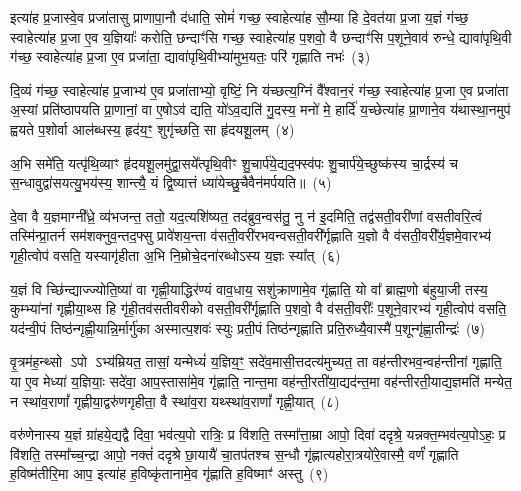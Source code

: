 इत्या॑ह प्र॒जास्वे॒व प्रजा॑तासु प्राणापा॒नौ द॑धाति॒ सोमं॑ गच्छ॒ स्वाहेत्या॑ह सौ॒म्या हि दे॒वत॑या प्र॒जा य॒ज्ञं ग॑च्छ॒ स्वाहेत्या॑ह प्र॒जा ए॒व य॒ज्ञियाः᳚ करोति॒ छन्दाꣳ॑सि गच्छ॒ स्वाहेत्या॑ह प॒शवो॒ वै छन्दाꣳ॑सि प॒शूने॒वाव॑ रुन्धे॒ द्यावा॑\-पृथि॒वी ग॑च्छ॒ स्वाहेत्या॑ह प्र॒जा ए॒व प्रजा॑ता॒ द्यावा॑\-पृथि॒वीभ्या॑मुभ॒यतः॒ परि॑ गृह्णाति नभः॑~(३)

दि॒व्यं ग॑च्छ॒ स्वाहेत्या॑ह प्र॒जाभ्य॑ ए॒व प्रजा॑ताभ्यो॒ वृष्टिं॒ नि य॑च्छत्य॒ग्निं वै᳚श्वान॒रं ग॑च्छ॒ स्वाहेत्या॑ह प्र॒जा ए॒व प्रजा॑ता अ॒स्यां प्रति॑\-ष्ठापयति प्रा॒णानां॒ वा ए॒षो\-ऽव॑ द्यति॒ यो॑\-ऽव॒द्यति॑ गु॒दस्य॒ मनो॑ मे॒ हार्दि॑ य॒च्छेत्या॑ह प्रा॒णाने॒व य॑थास्था॒नमुप॑ ह्वयते प॒शोर्वा आल॑ब्धस्य॒ हृद॑य॒ꣳ॒ शुगृ॑च्छति॒ सा हृ॑दयशू॒लम्~(४)

अ॒भि समे॑ति॒ यत्पृ॑थि॒व्याꣳ हृ॑दयशू॒लमु॑द्वा॒सये᳚त्पृथि॒वीꣳ शु॒चार्प॑ये॒द्यद॒फ्स्व॑पः शु॒चार्प॑ये॒च्छुष्क॑स्य चा॒र्द्रस्य॑ च स॒न्धावुद्वा॑सयत्यु॒भय॑स्य॒ शान्त्यै॒ यं द्वि॒ष्यात्तं ध्या॑येच्छु॒चैवैन॑मर्पयति॥~(५)

{\anuvakamend[{रेतो॑ मि॒त्रावरु॑णौ गच्छ॒ स्वाहा॒ नभो॑ हृदयशू॒लं द्वात्रिꣳ॑शच्च}]}%

दे॒वा वै य॒ज्ञमाग्नी᳚ध्रे॒ व्य॑भजन्त॒ ततो॒ यद॒त्यशि॑ष्यत॒ तद॑ब्रुव॒न्वस॑तु॒ नु न॑ इ॒दमिति॒ तद्व॑सती॒वरी॑णां वसतीवरि॒त्वं तस्मि॑न्प्रा॒तर्न सम॑शक्नुव॒न्तद॒फ्सु प्रावे॑शय॒न्ता व॑सती॒वरी॑रभवन्वसती॒वरी᳚र्गृह्णाति य॒ज्ञो वै व॑सती॒वरी᳚र्य॒ज्ञमे॒वारभ्य॑ गृही॒त्वोप॑ वसति॒ यस्यागृ॑हीता अ॒भि नि॒म्रोचे॒दना॑रब्धो\-ऽस्य य॒ज्ञः स्या᳚त्~(६)

य॒ज्ञं वि च्छि॑न्द्याज्ज्योति॒ष्या॑ वा गृह्णी॒याद्धिर॑ण्यं वाव॒धाय॒ सशु॑क्राणामे॒व गृ॑ह्णाति॒ यो वा᳚ ब्राह्म॒णो ब॑हुया॒जी तस्य॒ कुम्भ्या॑नां गृह्णीया॒थ्स हि गृ॑ही॒तव॑सतीवरीको वसती॒वरी᳚र्गृह्णाति प॒शवो॒ वै व॑सती॒वरीः᳚ प॒शूने॒वारभ्य॑ गृही॒त्वोप॑ वसति॒ यद॑न्वी॒पं तिष्ठ॑न्गृह्णी॒यान्नि॒र्मार्गु॑का अस्मात्प॒शवः॑ स्युः प्रती॒पं तिष्ठ॑न्गृह्णाति प्रति॒रुध्यै॒वास्मै॑ प॒शून्गृ॑ह्णा॒तीन्द्रः॑~(७)

वृ॒त्रम॑ह॒न्थ्सो \-ऽपो \-ऽभ्य॑म्रियत॒ तासां॒ यन्मेध्यं॑ य॒ज्ञिय॒ꣳ॒ सदे॑व॒मासी॒त्तदत्य॑मुच्यत॒ ता वह॑न्तीरभव॒न्वह॑न्तीनां गृह्णाति॒ या ए॒व मेध्या॑ य॒ज्ञियाः॒ सदे॑वा॒ आप॒स्तासा॑मे॒व गृ॑ह्णाति॒ नान्त॒मा वह॑न्ती॒रती॑या॒द्यद॑न्त॒मा वह॑न्तीरती॒याद्य॒ज्ञमति॑ मन्येत॒ न स्था॑व॒राणां᳚ गृह्णीया॒द्वरु॑णगृहीता॒ वै स्था॑व॒रा यथ्स्था॑व॒राणां᳚ गृह्णी॒यात्~(८)

वरु॑णेनास्य य॒ज्ञं ग्रा॑हये॒द्यद्वै दिवा॒ भव॑त्य॒पो रात्रिः॒ प्र वि॑शति॒ तस्मा᳚त्ता॒म्रा आपो॒ दिवा॑ ददृश्रे॒ यन्नक्त॒म्भव॑त्य॒पो\-ऽहः॒ प्र वि॑शति॒ तस्मा᳚च्च॒न्द्रा आपो॒ नक्तं॑ ददृश्रे छा॒यायै॑ चा॒तप॑तश्च स॒न्धौ गृ॑ह्णात्यहोरा॒त्रयो॑रे॒वास्मै॒ वर्णं॑ गृह्णाति ह॒विष्म॑तीरि॒मा आप॒ इत्या॑ह ह॒विष्कृ॑तानामे॒व गृ॑ह्णाति ह॒विष्माꣳ॑ अस्तु~(९)

